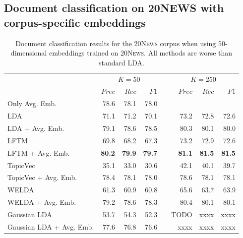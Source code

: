 \documentclass[
        a4paper,
        titlepage,
        twoside,
        parskip,
        numbers=noenddot
        ]{scrbook}
\newcommand{\ra}[1]{\renewcommand{\arraystretch}{#1}}
\theoremstyle{break}
\begin{document}
\begin{appendices}
  \subsection{Document classification on 20N{\footnotesize EWS} with corpus-specific embeddings}
  \label{sec:appendix_document_classification_corpus_specific}
  \begin{table}[]
    \ra{1.3}
    \centering
    \caption{Document classification results for the \textsc{20News} corpus when using 50-dimensional embeddings trained on \textsc{20News}.
    All methods are worse than standard LDA.}
    \label{table:document_classification_dim-50}
    \begin{tabular}{lrrrcrrr}
      \toprule
      \multirow{2}{*}{} & \multicolumn{3}{c}{$K = 50$} & \phantom{a} & \multicolumn{3}{c}{$K = 250$} \\ \cmidrule{2-4} \cmidrule{6-8}
                        & $Prec$    & $Rec$     & $F1$     && $Prec$    & $Rec$   & $F1$     \\ \midrule
                        Only Avg. Emb.           & 78.6    & 78.1    & 78.0   && \multicolumn{3}{l}{}        \\
                        LDA                      & 71.1    & 71.2    & 70.1   && 73.2    & 72.8     & 72.6   \\
                        LDA + Avg. Emb.          & 79.1    & 78.6    & 78.5   && 80.3    & 80.1     & 80.0   \\
                        LFTM                     & 69.8    & 68.2    & 67.3   && 73.2    & 72.9     & 72.6   \\
                        LFTM + Avg. Emb.         & \textbf{80.2}    & \textbf{79.9}    & \textbf{79.7}   && \textbf{81.1}    & \textbf{81.5}     & \textbf{81.5}   \\
                        TopicVec                 & 35.1    & 33.0    & 30.6   && 42.1    & 40.1     & 39.7   \\
                        TopicVec + Avg. Emb.     & 78.4    & 78.1    & 78.0   && 78.6    & 78.1     & 78.1   \\
                        WELDA                    & 61.3    & 60.9    & 60.8   && 65.6    & 63.7     & 63.9   \\ %
                        WELDA + Avg. Emb.        & 79.2    & 78.6    & 78.3   && 80.4    & 80.1     & 80.1   \\
                        Gaussian LDA             & 53.7    & 54.3    & 52.3   && TODO    & xxxx     & xxxx   \\
                        Gaussian LDA + Avg. Emb. & 77.6    & 76.8    & 76.6   && xxxx    & xxxx     & xxxx   \\
    \bottomrule
    \end{tabular}
  \end{table}

\end{appendices}
\end{document}
